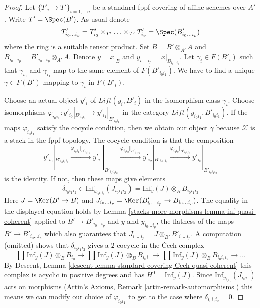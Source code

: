 \begin{proof}
Let $\{T'_i \to T'\}_{i = 1, \ldots n}$ be a standard fppf covering
of affine schemes over $A'$. Write $T' = \Spec(B')$. As usual denote
$$
T'_{i_0 \ldots i_p} =
T'_{i_0} \times_{T'} \ldots \times_{T'} T'_{i_p} = \Spec(B'_{i_0 \ldots i_p})
$$
where the ring is a suitable tensor product.
Set $B = B' \otimes_{A'} A$ and
$B_{i_0 \ldots i_p} = B'_{i_0 \ldots i_p} \otimes_{A'} A$.
Denote $y = x|_B$ and $y_{i_0 \ldots i_p} = x|_{B_{i_0 \ldots i_p}}$.
Let $\gamma_i \in F(B'_i)$ such that $\gamma_{i_0}$ and $\gamma_{i_1}$
map to the same element of $F(B'_{i_0i_1})$.
We have to find a unique $\gamma \in F(B')$ mapping to
$\gamma_i$ in $F(B'_i)$.

\medskip\noindent
Choose an actual object $y'_i$ of $\textit{Lift}(y_i, B'_i)$
in the isomorphism class $\gamma_i$.
Choose isomorphisms
$\varphi_{i_0i_1} : y'_{i_0}|_{B'_{i_0i_1}} \to y'_{i_1}|_{B'_{i_0i_1}}$
in the category $\textit{Lift}(y_{i_0i_1}, B'_{i_0i_1})$.
If the maps $\varphi_{i_0i_1}$ satisfy the cocycle condition,
then we obtain our object $\gamma$ because $\mathcal{X}$ is
a stack in the fppf topology. The cocycle condition is that the
composition
$$
y'_{i_0}|_{B'_{i_0i_1i_2}}
\xrightarrow{\varphi_{i_0i_1}|_{B'_{i_0i_1i_2}}}
y'_{i_1}|_{B'_{i_0i_1i_2}}
\xrightarrow{\varphi_{i_1i_2}|_{B'_{i_0i_1i_2}}}
y'_{i_2}|_{B'_{i_0i_1i_2}}
\xrightarrow{\varphi_{i_2i_0}|_{B'_{i_0i_1i_2}}}
y'_{i_0}|_{B'_{i_0i_1i_2}}
$$
is the identity. If not, then these maps give elements
$$
\delta_{i_0i_1i_2} \in
\text{Inf}_{y_{i_0i_1i_2}}(J_{i_0i_1i_2}) =
\text{Inf}_y(J) \otimes_B B_{i_0i_1i_2}
$$
Here $J = \Ker(B' \to B)$ and
$J_{i_0 \ldots i_p} = \Ker(B'_{i_0 \ldots i_p} \to B_{i_0 \ldots i_p})$.
The equality in the displayed equation holds by
Lemma \ref{stacks-more-morphisms-lemma-inf-quasi-coherent} applied to
$B' \to B'_{i_0 \ldots i_p}$ and $y$ and $y_{i_0 \ldots i_p}$,
the flatness of the maps $B' \to B'_{i_0 \ldots i_p}$
which also guarantees that
$J_{i_0 \ldots i_p} = J \otimes_{B'} B'_{i_0 \ldots i_p}$.
A computation (omitted) shows that $\delta_{i_0i_1i_2}$ gives
a $2$-cocycle in the {\v C}ech complex
$$
\prod \text{Inf}_y(J) \otimes_B B_{i_0} \to
\prod \text{Inf}_y(J) \otimes_B B_{i_0i_1} \to
\prod \text{Inf}_y(J) \otimes_B B_{i_0i_1i_2} \to \ldots
$$
By Descent, Lemma \ref{descent-lemma-standard-covering-Cech-quasi-coherent}
this complex is acyclic in positive degrees and has $H^0 = \text{Inf}_y(J)$.
Since $\text{Inf}_{y_{i_0i_1}}(J_{i_0i_1})$ acts on
morphisms (Artin's Axioms, Remark \ref{artin-remark-automorphisms})
this means we can modify our choice of $\varphi_{i_0i_1}$
to get to the case where $\delta_{i_0i_1i_2} = 0$.


\end{proof}
